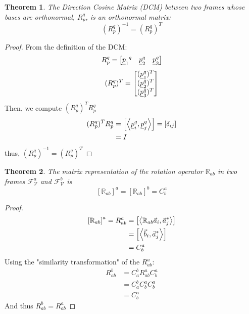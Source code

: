\documentclass{article}
\newtheorem{theorem}{Theorem}
\begin{document}
\begin{theorem}
    The Direction Cosine Matrix (DCM) between two frames whose bases are orthonormal, $R_p^q$, is an orthonormal matrix:
    $$(R_p^q)^{-1} = (R_p^q)^T$$
\end{theorem}

\begin{proof}
    From the definition of the DCM:
    \begin{equation*}
        R_p^q = \begin{bmatrix}{\underline{p}_1}^q & \underline{p}_2^q & \underline{p}_3^q\end{bmatrix}
    \end{equation*}
    \begin{equation*}
        (R_p^q)^T = \begin{bmatrix}
            (\underline{p}_1^q)^T\\
            (\underline{p}_2^q)^T\\
            (\underline{p}_3^q)^T\\
        \end{bmatrix}
    \end{equation*}
    Then, we compute $(R_p^q)^TR_p^q$
    \begin{align*}
        (R_p^q)^TR_p^q &= \left[\left<\underline{p}_i^q, \underline{p}_j^q\right>\right] = \left[\delta_{ij}\right] \\
        &= I
    \end{align*}
    thus, $(R_p^q)^{-1} = (R_p^q)^T$
\end{proof}

\begin{theorem}
    The matrix representation of the rotation operator $\mathbb{R}_{ab}$ in two frames $\mathcal{F}_{\mathcal{V}}^a$ and $\mathcal{F}_{\mathcal{V}}^b$ is
    $$\left[\mathbb{R}_{ab}\right]^a = \left[\mathbb{R}_{ab}\right]^b = C_b^a$$
\end{theorem}

\begin{proof}
    \begin{align*}
        \left[\mathbb{R}_{ab}\right]^a = R_{ab}^a &= \left[\left<\mathbb{R}_{ab}\vec{a}_i, \vec{a}^*_j\right>\right] \\
        &=\left[\left<\vec{b}_i, \vec{a}^*_j\right>\right]\\
        &= C_b^a\\
    \end{align*}
    Using the "similarity transformation" of the $R_{ab}^a$:
    \begin{align*}
        R_{ab}^b &= C_a^bR_{ab}^aC_b^a \\
        &= C_a^b C_b^a C_b^a \\
        &= C_b^a
    \end{align*}
    And thus $R_{ab}^b = R_{ab}^a$

\end{proof}
\end{document}
